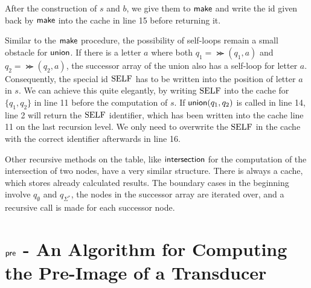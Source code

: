 \par 

After the construction of $s$ and $b$, we give them to $\operatorname{\textsf{make}}$ and write the id given back by $\operatorname{\textsf{make}}$ into the cache in line 15 before returning it.

\par

Similar to the $\operatorname{\textsf{make}}$ procedure, the possibility of self-loops remain a small obstacle for $\operatorname{\textsf{union}}$. If there is a letter $a$ where both $q_{1} = \Succ(q_{1},a)$ and $q_{2} = \Succ(q_{2},a)$, the successor array of the union also has a self-loop for letter $a$. Consequently, the special id $\mathrm{SELF}$ has to be written into the position of letter $a$ in $s$. We can achieve this quite elegantly, by writing $\mathrm{SELF}$ into the cache for $\{q_{1},q_{2}\}$ in line 11 before the computation of $s$. If $\operatorname{\textsf{union}}(q_{1},q_{2})$ is called in line 14, line 2 will return the $\mathrm{SELF}$ identifier, which has been written into the cache line 11 on the last recursion level. We only need to overwrite the $\mathrm{SELF}$ in the cache with the correct identifier afterwards in line 16.
\par
Other recursive methods on the table, like $\operatorname{\textsf{intersection}}$ for the computation of the intersection of two nodes, have a very similar structure. There is always a cache, which stores already calculated results. The boundary cases in the beginning involve $q_{\emptyset}$ and $q_{\Sigma^{*}}$, the nodes in the successor array are iterated over, and a recursive call is made for each successor node. 


\section{$\operatorname{\textsf{pre}}$ - An Algorithm for Computing the Pre-Image of a Transducer}\label{sec:pre}

